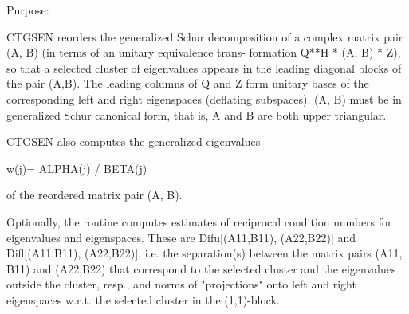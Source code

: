  \begin{DoxyParagraph}{Purpose\+: }
\begin{DoxyVerb} CTGSEN reorders the generalized Schur decomposition of a complex
 matrix pair (A, B) (in terms of an unitary equivalence trans-
 formation Q**H * (A, B) * Z), so that a selected cluster of eigenvalues
 appears in the leading diagonal blocks of the pair (A,B). The leading
 columns of Q and Z form unitary bases of the corresponding left and
 right eigenspaces (deflating subspaces). (A, B) must be in
 generalized Schur canonical form, that is, A and B are both upper
 triangular.

 CTGSEN also computes the generalized eigenvalues

          w(j)= ALPHA(j) / BETA(j)

 of the reordered matrix pair (A, B).

 Optionally, the routine computes estimates of reciprocal condition
 numbers for eigenvalues and eigenspaces. These are Difu[(A11,B11),
 (A22,B22)] and Difl[(A11,B11), (A22,B22)], i.e. the separation(s)
 between the matrix pairs (A11, B11) and (A22,B22) that correspond to
 the selected cluster and the eigenvalues outside the cluster, resp.,
 and norms of "projections" onto left and right eigenspaces w.r.t.
 the selected cluster in the (1,1)-block.\end{DoxyVerb}
 
\end{DoxyParagraph}

